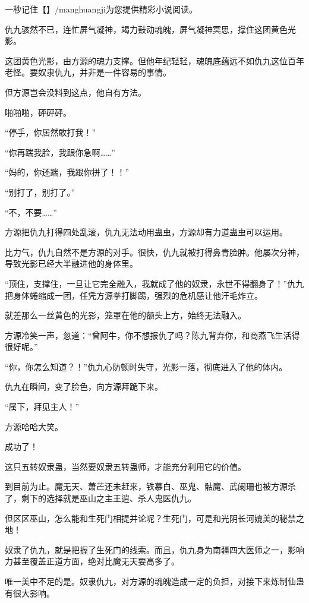 
\begin{this_body}

一秒记住【】/manghuangji为您提供精彩小说阅读。

仇九骇然不已，连忙屏气凝神，竭力鼓动魂魄，屏气凝神冥思，撑住这团黄色光影。

这团黄色光影，由方源的魂力支撑。但他年纪轻轻，魂魄底蕴远不如仇九这位百年老怪。要奴隶仇九，并非是一件容易的事情。

但方源岂会没料到这点，他自有方法。

啪啪啪，砰砰砰。

“停手，你居然敢打我！”

“你再踹我脸，我跟你急啊……”

“妈的，你还踹，我跟你拼了！！”

“别打了，别打了。”

“不，不要……”

方源把仇九打得四处乱滚，仇九无法动用蛊虫，方源却有力道蛊虫可以运用。

比力气，仇九自然不是方源的对手。很快，仇九就被打得鼻青脸肿。他屡次分神，导致光影已经大半融进他的身体里。

“顶住，支撑住，一旦让它完全融入，我就成了他的奴隶，永世不得翻身了！”仇九把身体蜷缩成一团，任凭方源拳打脚踢，强烈的危机感让他汗毛炸立。

就差那么一丝黄色的光影，笼罩在他的额头上方，始终无法融入。

方源冷笑一声，忽道：“曾阿牛，你不想报仇了吗？陈九背弃你，和商燕飞生活得很好呢。”

“你，你怎么知道？！”仇九心防顿时失守，光影一落，彻底进入了他的体内。

仇九在瞬间，变了脸色，向方源拜跪下来。

“属下，拜见主人！”

方源哈哈大笑。

成功了！

这只五转奴隶蛊，当然要奴隶五转蛊师，才能充分利用它的价值。

到目前为止。魔无天、萧芒还未赶来，铁慕白、巫鬼、骷魔、武阑珊也被方源杀了，剩下的选择就是巫山之主王逍、杀人鬼医仇九。

但区区巫山，怎么能和生死门相提并论呢？生死门，可是和光阴长河媲美的秘禁之地！

奴隶了仇九，就是把握了生死门的线索。而且，仇九身为南疆四大医师之一，影响力甚至覆盖正道方面，绝对比魔无天要高多了。

唯一美中不足的是。奴隶仇九，对方源的魂魄造成一定的负担，对接下来炼制仙蛊有很大影响。


\end{this_body}
